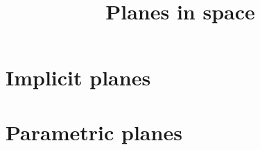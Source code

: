 \documentclass{ximera}
\title[Dig-In:]{Planes in space}
\begin{document}
\begin{abstract}
\end{abstract}
\maketitle

\section{Implicit planes}

\section{Parametric planes}
\end{document}
